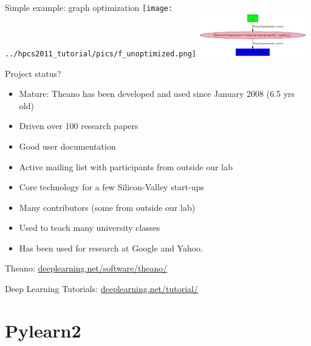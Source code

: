 \documentclass[utf8x,xcolor=pdftex,dvipsnames,table]{beamer}
\begin{document}
\begin{frame}{Simple example: graph optimization}
\center
\texttt{[image: ../hpcs2011\_tutorial/pics/f\_unoptimized.png]}
\hspace{0.1\textwidth}
\includegraphics[width=0.35\textwidth]{../hpcs2011_tutorial/pics/f_optimized.png}

\end{frame}


\begin{frame}{Project status?}
  \begin{itemize}
    \item Mature: Theano has been developed and used since January 2008 (6.5 yrs old)
    \item Driven over 100 research papers
    \item Good user documentation
    \item Active mailing list with participants from outside our lab
    \item Core technology for a few Silicon-Valley start-ups
    \item Many contributors (some from outside our lab)
    \item Used to teach many university classes
    \item Has been used for research at Google and Yahoo.
  \end{itemize}
  Theano: \url{deeplearning.net/software/theano/}

  Deep Learning Tutorials: \url{deeplearning.net/tutorial/}
\end{frame}


\section{Pylearn2}
\begin{frame}
  \tableofcontents[currentsection]
\end{frame}
\end{document}
